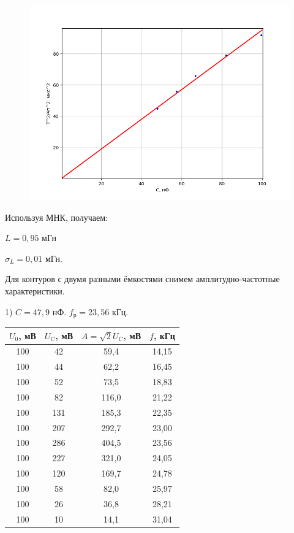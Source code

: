 \documentclass[a4paper,12pt]{article} %
\begin{document}
\begin{figure}[h!]
	\centering
	\includegraphics[scale=0.80]{T(C).png}
\end{figure}
		
Используя МНК, получаем:

$L = 0,95$ мГн

$\sigma_L = 0,01$ мГн.
\newpage

Для контуров с двумя разными ёмкостями снимем амплитудно-частотные характеристики.

1) $C = 47,9$ нФ. $f_{\text{р}} = 23,56$ кГц.

\begin{table}[h!]
	\centering
	\begin{tabular}{|c|c|c|c|}
		\hline
		$U_0$, мВ & $U_C$, мВ & $A = \sqrt{2}U_C$, мВ & $f$, кГц \\ \hline
		100       & 42        & 59,4                  & 14,15   \\ \hline
		100       & 44        & 62,2                  & 16,45   \\ \hline
		100       & 52        & 73,5                  & 18,83   \\ \hline
		100       & 82        & 116,0                 & 21,22   \\ \hline
		100       & 131       & 185,3                 & 22,35   \\ \hline
		100       & 207       & 292,7                 & 23,00   \\ \hline
		100       & 286       & 404,5                 & 23,56   \\ \hline
		100       & 227       & 321,0                 & 24,05   \\ \hline
		100       & 120       & 169,7                 & 24,78   \\ \hline
		100       & 58        & 82,0                  & 25,97   \\ \hline
		100       & 26        & 36,8                  & 28,21   \\ \hline
		100       & 10        & 14,1                  & 31,04   \\ \hline
	\end{tabular}
\end{table}
\end{document}
